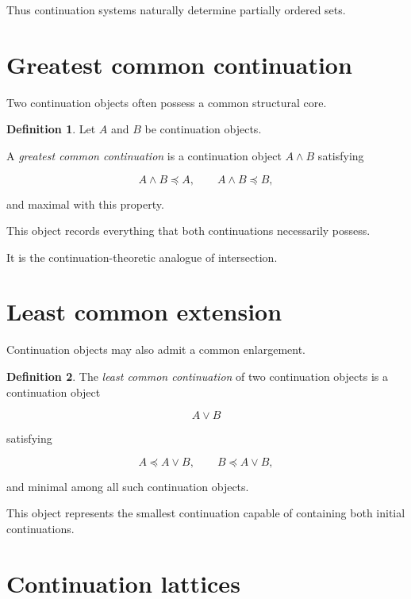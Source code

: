 \documentclass[13pt,openany]{book}
\theoremstyle{plain}
\theoremstyle{definition}
\newtheorem{definition}{Definition}[chapter]
\begin{document}
Thus continuation systems naturally determine partially ordered sets.

\section{Greatest common continuation}

Two continuation objects often possess a common structural core.

\begin{definition}
Let \(A\) and \(B\) be continuation objects.

A \emph{greatest common continuation} is a continuation object
\(A\wedge B\) satisfying

\[
A\wedge B\preccurlyeq A,
\qquad
A\wedge B\preccurlyeq B,
\]

and maximal with this property.
\end{definition}

This object records everything that both continuations necessarily possess.

It is the continuation-theoretic analogue of intersection.

\section{Least common extension}

Continuation objects may also admit a common enlargement.

\begin{definition}
The \emph{least common continuation} of two continuation objects is a
continuation object

\[
A\vee B
\]

satisfying

\[
A\preccurlyeq A\vee B,
\qquad
B\preccurlyeq A\vee B,
\]

and minimal among all such continuation objects.
\end{definition}

This object represents the smallest continuation capable of containing both
initial continuations.

\section{Continuation lattices}
\end{document}
